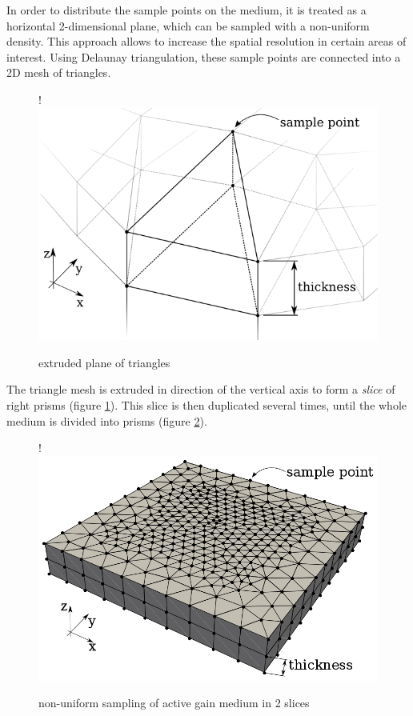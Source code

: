 In order to distribute the sample points on the medium, it is treated as
a horizontal 2-dimensional plane, which can be sampled with a non-uniform
density. This approach allows to increase the spatial resolution in certain
areas of interest. Using Delaunay triangulation, these sample points are
connected into a 2D mesh of triangles.

\begin{figure}[H]
  \centerline{
     {!} {\includegraphics{graphics/delauny_3.png}}
  }
  \caption{extruded plane of triangles}
  \label{graphic:extruded_mesh}
\end{figure}

The triangle mesh is extruded in direction of the vertical axis to form a
\emph{slice} of right prisms (figure \ref{graphic:extruded_mesh}). This
slice is then duplicated several times, until the whole medium is divided into
prisms (figure \ref{graphic:samples_reduced}).

\begin{figure}
  \centerline{
     {!} {\includegraphics{graphics/samples_reduced.png}}
  }
  \caption{non-uniform sampling of active gain medium in 2 slices}
  \label{graphic:samples_reduced}
\end{figure}




